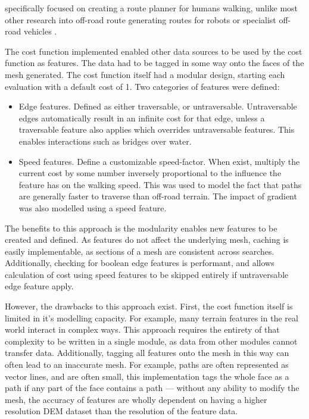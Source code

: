 \documentclass[12pt]{article}
\begin{document}
\autocite{evans2023tsr} specifically focused on creating a route planner for humans walking, unlike most other research into off-road route generating routes for robots or specialist off-road vehicles \autocite{perkins2013fielddstar,zhao2024searchrescue}.

The cost function implemented enabled other data sources to be used by the cost function as features. The data had to be tagged in some way onto the faces of the mesh generated. The cost function itself had a modular design, starting each evaluation with a default cost of 1. Two categories of features were defined:

\begin{itemize}
  \item Edge features. Defined as either traversable, or untraversable. Untraversable edges automatically result in an infinite cost for that edge, unless a traversable feature also applies which overrides untraversable features. This enables interactions such as bridges over water.
  \item Speed features. Define a customizable speed-factor. When exist, multiply the current cost by some number inversely proportional to the influence the feature has on the walking speed. This was used to model the fact that paths are generally faster to traverse than off-road terrain. The impact of gradient was also modelled using a speed feature.
\end{itemize}

The benefits to this approach is the modularity enables new features to be created and defined. As features do not affect the underlying mesh, caching is easily implementable, as sections of a mesh are consistent across searches. Additionally, checking for boolean edge features is performant, and allows calculation of cost using speed features to be skipped entirely if untraversable edge feature apply.

However, the drawbacks to this approach exist. First, the cost function itself is limited in it's modelling capacity. For example, many terrain features in the real world interact in complex ways. This approach requires the entirety of that complexity to be written in a single module, as data from other modules cannot transfer data. Additionally, tagging all features onto the mesh in this way can often lead to an inaccurate mesh. For example, paths are often represented as vector lines, and are often small, this implementation tags the whole face as a path if any part of the face contains a path --- without any ability to modify the mesh, the accuracy of features are wholly dependent on having a higher resolution DEM dataset than the resolution of the feature data.
\end{document}
